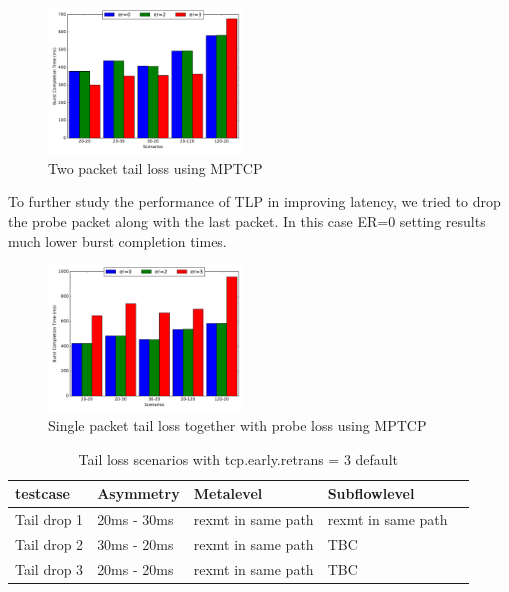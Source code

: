 \documentclass[10pt,draftcls,twocolumn]{IEEEconf}
\begin{document}
\begin{figure}[!ht]
\begin{center}
\includegraphics[angle=0, width=0.46\textwidth,natwidth=578.16,natheight=433.62]{plots/2P.pdf}
\caption{Two packet tail loss using MPTCP}\label{2p}
\end{center}
\end{figure}

To further study the performance of TLP in improving latency, we tried to drop the probe packet along with the last packet. In this case ER=0
setting results much lower burst completion times. 

\begin{figure}[!ht]
\begin{center}
\includegraphics[angle=0, width=0.46\textwidth, natwidth=578.16,natheight=433.62]{plots/1PP.pdf}
\caption{Single packet tail loss together with probe loss using MPTCP}\label{1pp}
\end{center}
\end{figure}





\begin{table}[!ht]
\centering
\caption{Tail loss scenarios with tcp.early.retrans = 3 default}
\label{ret3}
\begin{tabular}{|l|l|l|l|l|}
\hline
 testcase   & Asymmetry   & Metalevel          & Subflowlevel       &  \\\hline
Tail drop 1 & 20ms - 30ms & rexmt in same path & rexmt in same path &  \\\hline
Tail drop 2 & 30ms - 20ms & rexmt in same path & TBC                &  \\\hline
Tail drop 3 & 20ms - 20ms & rexmt in same path & TBC                &  \\ \hline
\end{tabular}
\end{table}
\end{document}
